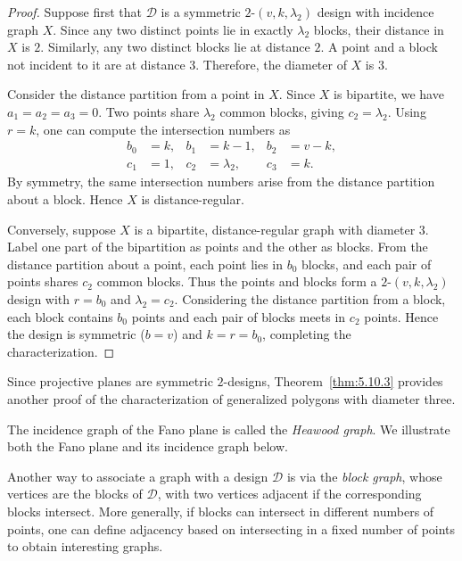 \documentclass[12pt,a4paper,openany]{book}
\begin{document}
\begin{proof}
Suppose first that $\mathcal{D}$ is a symmetric $2$-$(v,k,\lambda_2)$ design with incidence graph $X$.  
Since any two distinct points lie in exactly $\lambda_2$ blocks, their distance in $X$ is $2$.  
Similarly, any two distinct blocks lie at distance $2$.  
A point and a block not incident to it are at distance $3$. Therefore, the diameter of $X$ is $3$.  

Consider the distance partition from a point in $X$. Since $X$ is bipartite, we have $a_1 = a_2 = a_3 = 0$.  
Two points share $\lambda_2$ common blocks, giving $c_2 = \lambda_2$. Using $r=k$, one can compute the intersection numbers as
\[
\begin{aligned}
b_0 &= k, & b_1 &= k-1, & b_2 &= v - k, \\
c_1 &= 1, & c_2 &= \lambda_2, & c_3 &= k.
\end{aligned}
\]
By symmetry, the same intersection numbers arise from the distance partition about a block.  
Hence $X$ is distance-regular.

Conversely, suppose $X$ is a bipartite, distance-regular graph with diameter $3$.  
Label one part of the bipartition as points and the other as blocks.  
From the distance partition about a point, each point lies in $b_0$ blocks, and each pair of points shares $c_2$ common blocks.  
Thus the points and blocks form a $2$-$(v,k,\lambda_2)$ design with $r=b_0$ and $\lambda_2 = c_2$.  
Considering the distance partition from a block, each block contains $b_0$ points and each pair of blocks meets in $c_2$ points.  
Hence the design is symmetric ($b=v$) and $k=r=b_0$, completing the characterization.
\end{proof}

Since projective planes are symmetric $2$-designs, Theorem~\ref{thm:5.10.3} provides another proof of the characterization of generalized polygons with diameter three.  

The incidence graph of the Fano plane is called the \emph{Heawood graph}.  
We illustrate both the Fano plane and its incidence graph below.





Another way to associate a graph with a design $\mathcal{D}$ is via the \emph{block graph}, whose vertices are the blocks of $\mathcal{D}$, with two vertices adjacent if the corresponding blocks intersect.  
More generally, if blocks can intersect in different numbers of points, one can define adjacency based on intersecting in a fixed number of points to obtain interesting graphs.
\end{document}
